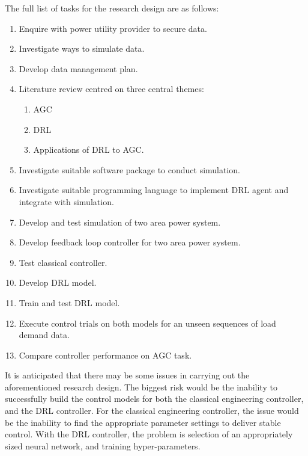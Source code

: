 The full list of tasks for the research design are as follows:
\begin{enumerate}
	\item Enquire with power utility provider to secure data.
	\item Investigate ways to simulate data.
	\item Develop data management plan.
	\item Literature review centred on three central themes:
	\begin{enumerate}
		\item AGC
		\item DRL
		\item Applications of DRL to AGC.
	\end{enumerate}
	\item Investigate suitable software package to conduct simulation.
	\item Investigate suitable programming language to implement DRL agent and integrate with simulation.
	\item Develop and test simulation of two area power system.
	\item Develop feedback loop controller for two area power system.
	\item Test classical controller.
	\item Develop DRL model.
	\item Train and test DRL model.
	\item Execute control trials on both models for an unseen sequences of load demand data.
	\item Compare controller performance on AGC task.
\end{enumerate}

It is anticipated that there may be some issues in carrying out the aforementioned research design. The biggest risk would be the inability to successfully build the control models for both the classical engineering controller, and the DRL controller. For the classical engineering controller, the issue would be the inability to find the appropriate parameter settings to deliver stable control. With the DRL controller, the problem is selection of an appropriately sized neural network, and training hyper-parameters.
